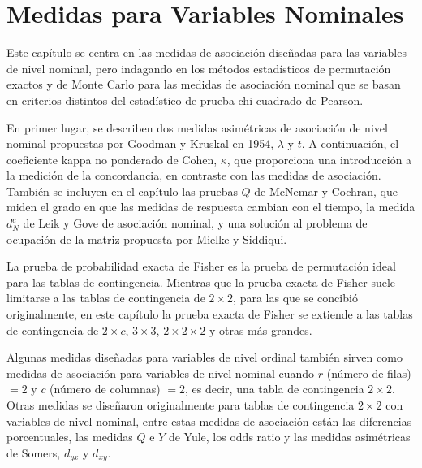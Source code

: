 \documentclass[12pt,a4paper,]{book}
\title{}
\author{Gloria Vizcaíno Castaño}
\date{27/10/2017}
\def\ifdoblecara{} %
\def\ifprincipal{} %
\let\ifprincipal\undefined %
\numberwithin{dummy}{section}
\theoremstyle{ocrenumbox}
\theoremstyle{blacknumex}
\theoremstyle{blacknumbox}
\theoremstyle{ocrenum}
\theoremstyle{ocrenum}
\begin{document}
\raggedbottom

\ifdefined\ifprincipal
\else
\setlength{\parindent}{1em}
\pagestyle{fancy}
\setcounter{tocdepth}{4}
\tableofcontents

\fi

\ifdefined\ifdoblecara
\fancyhead{}{}
\fancyhead[LE,RO]{\scriptsize\rightmark}
\fancyfoot[LO,RE]{\scriptsize\slshape \leftmark}
\fancyfoot[C]{}
\fancyfoot[LE,RO]{\footnotesize\thepage}
\else
\fancyhead{}{}
\fancyhead[RO]{\scriptsize\rightmark}
\fancyfoot[LO]{\scriptsize\slshape \leftmark}
\fancyfoot[C]{}
\fancyfoot[RO]{\footnotesize\thepage}
\fi
\renewcommand{\headrulewidth}{0.4pt}
\renewcommand{\footrulewidth}{0.4pt}

\hypertarget{medidas-para-variables-nominales}{%
\chapter{Medidas para Variables
Nominales}\label{medidas-para-variables-nominales}}

Este capítulo se centra en las medidas de asociación diseñadas para las
variables de nivel nominal, pero indagando en los métodos estadísticos
de permutación exactos y de Monte Carlo para las medidas de asociación
nominal que se basan en criterios distintos del estadístico de prueba
chi-cuadrado de Pearson.

En primer lugar, se describen dos medidas asimétricas de asociación de
nivel nominal propuestas por Goodman y Kruskal en 1954, \(\lambda\) y
\(t\). A continuación, el coeficiente kappa no ponderado de Cohen,
\(\kappa\), que proporciona una introducción a la medición de la
concordancia, en contraste con las medidas de asociación. También se
incluyen en el capítulo las pruebas \(Q\) de McNemar y Cochran, que
miden el grado en que las medidas de respuesta cambian con el tiempo, la
medida \(d^c_N\) de Leik y Gove de asociación nominal, y una solución al
problema de ocupación de la matriz propuesta por Mielke y Siddiqui.

La prueba de probabilidad exacta de Fisher es la prueba de permutación
ideal para las tablas de contingencia. Mientras que la prueba exacta de
Fisher suele limitarse a las tablas de contingencia de \(2\times2\),
para las que se concibió originalmente, en este capítulo la prueba
exacta de Fisher se extiende a las tablas de contingencia de
\(2\times c\), \(3\times3\), \(2\times2\times2\) y otras más grandes.

Algunas medidas diseñadas para variables de nivel ordinal también sirven
como medidas de asociación para variables de nivel nominal cuando \(r\)
(número de filas) \(= 2\) y \(c\) (número de columnas) \(= 2\), es
decir, una tabla de contingencia \(2\times2\). Otras medidas se
diseñaron originalmente para tablas de contingencia \(2\times2\) con
variables de nivel nominal, entre estas medidas de asociación están las
diferencias porcentuales, las medidas \(Q\) e \(Y\) de Yule, los odds
ratio y las medidas asimétricas de Somers, \(d_{yx}\) y \(d_{xy}\).
\end{document}
